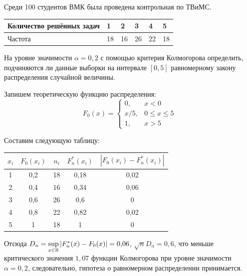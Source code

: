 \begin{exmp}
Среди 100 студентов ВМК была проведена контрольная по ТВиМС.
\begin{center}
    \begin{tabular}{|l|l|l|l|l|l|}
    \hline Количество решённых задач & 1  & 2  & 3  & 4  & 5 \\
    \hline Частота                   & 18 & 16 & 26 & 22 & 18 \\
    \hline
\end{tabular}
\end{center}
На уровне значимости $\alpha=0{,}2$ с помощью критерия Колмогорова определить, 
подчиняются ли данные выборки на интервале $[0, 5]$ равномерному закону распределения случайной величины.

Запишем теоретическую функцию распределения:
\begin{equation*}
    F_{0}(x) = \begin{cases}
        0, & x<0 \\
        x/5, & 0 \leqslant x \leqslant 5 \\
        1, & x>5    
    \end{cases}
\end{equation*}

Составим следующую таблицу:
\begin{center}
    \begin{tabular}{|c|c|c|c|c|}
        \hline $x_{i}$ & $F_0(x_{i})$ & $n_{i}$ & $F^{*}_{n}(x_{i})$ & $|F_{0}(x_{i})-F^{*}_{n}(x_{i})|$ \\
        \hline 1 & 0{,}2 & 18 & 0{,}18 & 0{,}02 \\
        \hline 2 & 0{,}4 & 16 & 0{,}34 & 0{,}06 \\
        \hline 3 & 0{,}6 & 26 & 0{,}6  & 0    \\
        \hline 4 & 0{,}8 & 22 & 0{,}82 & 0{,}02 \\
        \hline 5 &   1 & 18 &    1 & 0    \\
        \hline
    \end{tabular}
\end{center}
Отсюда $D_{n}=\sup\limits_{x \in \mathbb{R}}\left|F_{n}^{*}(x)-F_{0}(x)\right| = 0{,}06$, $\sqrt{n}D_{n} = 0{,}6$, 
что меньше критического значения $1{,}07$ функции Колмогорова при уровне значимости $\alpha=0{,}2$, следовательно, гипотеза о равномерном распределении принимается.
\end{exmp}
